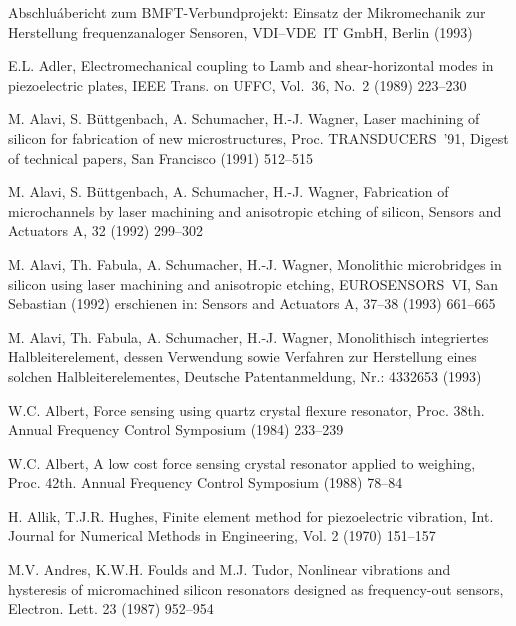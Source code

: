 
\newpage
{}
\begin{thebibliography}{xxx}

 Abschluábericht zum BMFT-Verbundprojekt: Einsatz der Mikromechanik
 zur Herstellung frequenzanaloger Sensoren, VDI--VDE~IT GmbH, Berlin (1993)

 E.L. Adler, Electromechanical coupling to Lamb and shear-horizontal modes
 in piezoelectric plates, IEEE Trans. on UFFC, Vol.~36, No.~2 (1989) 223--230

 M. Alavi, S. Büttgenbach, A. Schumacher, H.-J. Wagner,
 Laser machining of silicon for fabrication of new microstructures,
 Proc. TRANSDUCERS~'91, Digest of technical papers, San Francisco
 (1991) 512--515

 M. Alavi, S. Büttgenbach, A. Schumacher, H.-J. Wagner,
 Fabrication of microchannels by laser machining and anisotropic etching of
 silicon, Sensors and Actuators A, 32 (1992) 299--302

 M. Alavi, Th. Fabula, A. Schumacher, H.-J. Wagner,
 Monolithic microbridges in silicon using laser machining and anisotropic
 etching, EUROSENSORS~VI, San Sebastian (1992) erschienen in: Sensors and
 Actuators A, 37--38 (1993) 661--665

 M. Alavi, Th. Fabula, A. Schumacher, H.-J. Wagner,
 Monolithisch integriertes Halbleiterelement, dessen Verwendung sowie
 Verfahren zur Herstellung eines solchen Halbleiterelementes,
 Deutsche Patentanmeldung, Nr.: 4332653 (1993)

 W.C. Albert, Force sensing using quartz crystal flexure resonator,
 Proc. 38th. Annual Frequency Control Symposium (1984) 233--239

 W.C. Albert, A low cost force sensing crystal resonator applied to weighing,
 Proc. 42th. Annual Frequency Control Symposium (1988) 78--84

 H. Allik, T.J.R. Hughes, Finite element method for piezoelectric vibration,
 Int. Journal for Numerical Methods in Engineering, Vol. 2 (1970) 151--157

 M.V. Andres, K.W.H. Foulds and M.J. Tudor, Nonlinear vibrations and
 hysteresis of micromachined silicon resonators designed as frequency-out
 sensors, Electron. Lett. 23 (1987) 952--954


\end{thebibliography}
